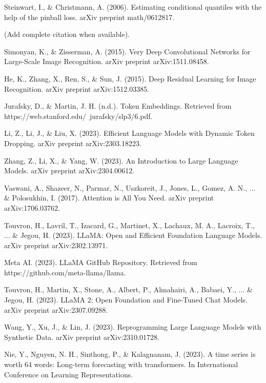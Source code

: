\begin{thebibliography}{99}
	 Steinwart, I., \& Christmann, A. (2006). Estimating conditional quantiles with the help of the pinball loss. arXiv preprint math/0612817.

	 (Add complete citation when available).

	 Simonyan, K., \& Zisserman, A. (2015). Very Deep Convolutional Networks for Large-Scale Image Recognition. arXiv preprint arXiv:1511.08458.

	 He, K., Zhang, X., Ren, S., \& Sun, J. (2015). Deep Residual Learning for Image Recognition. arXiv preprint arXiv:1512.03385.

	 Jurafsky, D., \& Martin, J. H. (n.d.). Token Embeddings. Retrieved from https://web.stanford.edu/~jurafsky/slp3/6.pdf.

	 Li, Z., Li, J., \& Liu, X. (2023). Efficient Language Models with Dynamic Token Dropping. arXiv preprint arXiv:2303.18223.

	 Zhang, Z., Li, X., \& Yang, W. (2023). An Introduction to Large Language Models. arXiv preprint arXiv:2304.00612.

	 Vaswani, A., Shazeer, N., Parmar, N., Uszkoreit, J., Jones, L., Gomez, A. N., ... \& Polosukhin, I. (2017). Attention is All You Need. arXiv preprint arXiv:1706.03762.

	 Touvron, H., Lavril, T., Izacard, G., Martinet, X., Lachaux, M. A., Lacroix, T., ... \& Jegou, H. (2023). LLaMA: Open and Efficient Foundation Language Models. arXiv preprint arXiv:2302.13971.

	 Meta AI. (2023). LLaMA GitHub Repository. Retrieved from https://github.com/meta-llama/llama.

	 Touvron, H., Martin, X., Stone, A., Albert, P., Almahairi, A., Babaei, Y., ... \& Jegou, H. (2023). LLaMA 2: Open Foundation and Fine-Tuned Chat Models. arXiv preprint arXiv:2307.09288.

	 Wang, Y., Xu, J., \& Lin, J. (2023). Reprogramming Large Language Models with Synthetic Data. arXiv preprint arXiv:2310.01728.

	 Nie, Y., Nguyen, N. H., Sinthong, P., \& Kalagnanam, J. (2023). A time series is worth 64 words: Long-term forecasting with transformers. In International Conference on Learning Representations.

\end{thebibliography}
